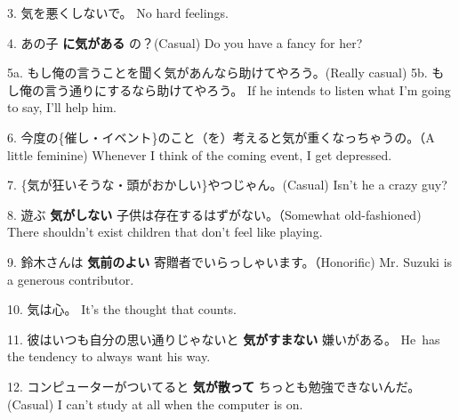 \par{3. 気を悪くしないで。 \hfill\break
No hard feelings. }

\par{4. あの子 \textbf{に気がある }の？(Casual) \hfill\break
Do you have a fancy for her? }

\par{5a. もし俺の言うことを聞く気があんなら助けてやろう。(Really casual) \hfill\break
5b. もし俺の言う通りにするなら助けてやろう。 \hfill\break
If he intends to listen what I'm going to say, I'll help him. }

\par{6. 今度の\{催し・イベント\}のこと（を）考えると気が重くなっちゃうの。（A little feminine) \hfill\break
Whenever I think of the coming event, I get depressed. }

\par{7. \{気が狂いそうな・頭がおかしい\}やつじゃん。(Casual) \hfill\break
Isn't he a crazy guy? }

\par{8. 遊ぶ \textbf{気がしない }子供は存在するはずがない。（Somewhat old-fashioned) \hfill\break
There shouldn't exist children that don't feel like playing. }

\par{9. 鈴木さんは \textbf{気前のよい }寄贈者でいらっしゃいます。（Honorific) \hfill\break
Mr. Suzuki is a generous contributor. }

\par{10. 気は心。 \hfill\break
It's the thought that counts. }

\par{11. 彼はいつも自分の思い通りじゃないと \textbf{気がすまない }嫌いがある。 \hfill\break
He has the tendency to always want his way. }

\par{12. コンピューターがついてると \textbf{気が散って }ちっとも勉強できないんだ。(Casual) \hfill\break
I can't study at all when the computer is on. }
    